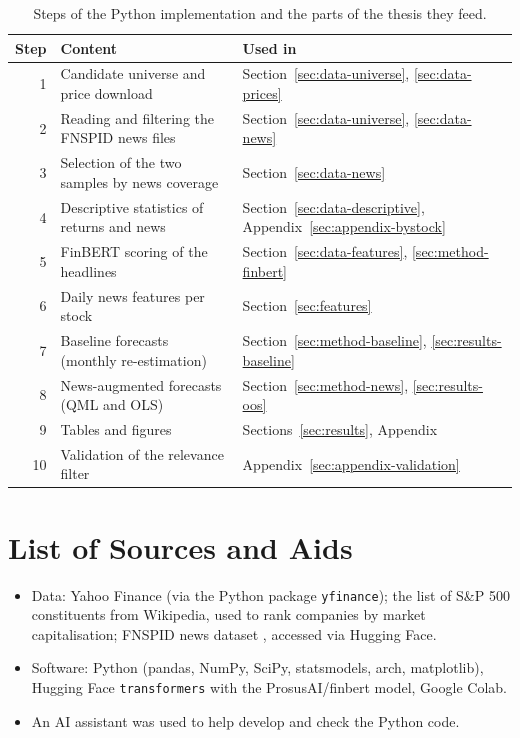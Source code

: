 \documentclass[12pt,a4paper]{article}
\begin{document}
\begin{table}[htbp]
  \centering\small
  \caption[Steps of the implementation]{Steps of the Python implementation and the parts of the thesis they feed.}
  \label{tab:python-steps}
  \begin{tabular}{rp{5.2cm}p{6.4cm}}
    \toprule
    Step & Content & Used in \\
    \midrule
    1 & Candidate universe and price download & Section~\ref{sec:data-universe}, \ref{sec:data-prices} \\
    2 & Reading and filtering the FNSPID news files & Section~\ref{sec:data-universe}, \ref{sec:data-news} \\
    3 & Selection of the two samples by news coverage & Section~\ref{sec:data-news} \\
    4 & Descriptive statistics of returns and news & Section~\ref{sec:data-descriptive}, Appendix~\ref{sec:appendix-bystock} \\
    5 & FinBERT scoring of the headlines & Section~\ref{sec:data-features}, \ref{sec:method-finbert} \\
    6 & Daily news features per stock & Section~\ref{sec:features} \\
    7 & Baseline forecasts (monthly re-estimation) & Section~\ref{sec:method-baseline}, \ref{sec:results-baseline} \\
    8 & News-augmented forecasts (QML and OLS) & Section~\ref{sec:method-news}, \ref{sec:results-oos} \\
    9 & Tables and figures & Sections~\ref{sec:results}, Appendix \\
    10 & Validation of the relevance filter & Appendix~\ref{sec:appendix-validation} \\
    \bottomrule
  \end{tabular}
\end{table}

\newpage
\section*{List of Sources and Aids}
\begin{itemize}
  \item Data: Yahoo Finance (via the Python package \texttt{yfinance}); the list of S\&P 500 constituents from Wikipedia, used to rank companies by market capitalisation; FNSPID news dataset \parencite{dong2024}, accessed via Hugging Face.
  \item Software: Python (pandas, NumPy, SciPy, statsmodels, arch, matplotlib), Hugging Face \texttt{transformers} with the ProsusAI/finbert model, Google Colab.
  \item An AI assistant was used to help develop and check the Python code.
\end{itemize}
\end{document}
